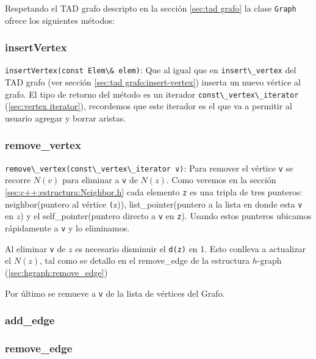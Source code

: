 \documentclass[a4paper,12pt]{article}
\makeatletter
\newcommand{\Code}[1]{\lstinline[basicstyle={\tt}]@#1@}
\makeatother
\begin{document}
Respetando el TAD grafo descripto en la sección \ref{sec:tad grafo} la clase \Code{Graph} ofrece los siguientes métodos:
\subsubsection{insertVertex}
\label{sec:insertVertex}
\Code{insertVertex(const Elem\& elem)}: Que al igual que en \Code{insert\_vertex} del TAD grafo (ver sección \ref{sec:tad grafo:insert-vertex}) inserta un nuevo vértice al grafo.
El tipo de retorno del método es un iterador \Code{const\_vertex\_iterator} (\ref{sec:vertex iterator}), recordemos que este iterador es el que va a permitir al usuario agregar y borrar aristas.


\subsubsection{remove\_vertex}
\label{sec:remove-vertex}

\Code{remove\_vertex(const\_vertex\_iterator v)}: Para remover el vértice \Code{v} se recorre $N(v)$ para eliminar a \Code{v} de $N(z)$. Como veremos en la sección \ref{sec:c++:estructura:Neighbor.h} cada elemento \Code{z} es una tripla de tres punteros:
neighbor(puntero al vértice \Code(z)), list\_pointer(puntero a la lista en donde esta \Code{v} en $z$) y el self\_pointer(puntero directo a \Code{v} en \Code{z}). Usando estos punteros ubicamos rápidamente a \Code{v} y lo eliminamos.

Al eliminar \Code{v} de $z$ es necesario disminuir el \Code{d(z)} en 1. Esto conlleva a actualizar el $N(z)$, tal como se detallo en el remove\_edge de la estructura $h$-graph (\ref{sec:hgraph:remove_edge})

Por último se remueve a \Code{v} de la lista de vértices del Grafo.

\subsubsection{add\_edge}
\label{sec:add-edge}


\subsubsection{remove\_edge}
\label{sec:remove-edge}
\end{document}
